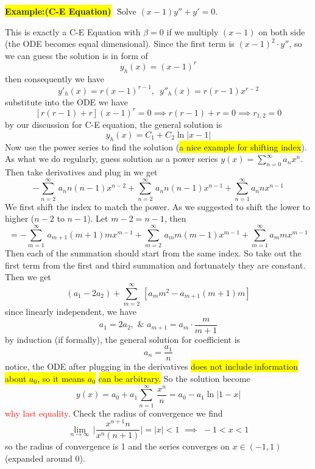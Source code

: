 \documentclass[10pt]{article}
\newcommand{\hilight}[1]{\colorbox{yellow}{#1}}
\newenvironment{changemargin}[2]{%
  \begin{list}{}{%
    \setlength{\topsep}{0pt}%
    \setlength{\leftmargin}{#1}%
    \setlength{\rightmargin}{#2}%
    \setlength{\listparindent}{\parindent}%
    \setlength{\itemindent}{\parindent}%
    \setlength{\parsep}{\parskip}%
  }%
  \item[]}{\end{list}}
\begin{document}
\begin{changemargin}{-0.125in}{0in}
\begin{enumerate}
	  
      \hilight{\textbf{Example:(C-E Equation)}} \,\,\.Solve $(x - 1)y'' + y' = 0$. 
	  
	  \medskip
	  
	   This is exactly a C-E Equation with $\beta = 0$ if we multiply $(x -1)$ on both side (the ODE becomes equal dimensional). Since the first term is $(x-1)^2\cdot y''$, so we can guess the solution is in form of 
	   \[
	   y_h(x) = (x - 1)^r
	   \]
	   then consequently we have 
	   \[
	   y'_h(x) = r(x - 1)^{r-1},\,\,\, y''_h(x) = r(r-1)x^{r-2}
	   \]
	   substitute into the ODE we have 
	   \[
	   [r(r-1) + r] (x-1)^r = 0 \implies r(r-1) + r = 0 \implies r_{1,2} = 0
	   \]
	   by our discussion for C-E equation, the general solution is 
	   \[
	   y_h(x) = C_1 + C_2 \ln |x-1|
	   \]
	   Now use the power series to find the solution (\hilight{a nice example for shifting index}). As what we do regularly, guess solution as a power series $y(x) = \sum^\infty_{n=0} a_nx^n$. Then take derivatives and plug in we get 
	   \[
	   -\sum_{n=2}^\infty \,a_n n (n-1) x^{n-2} + \sum_{n=2}^\infty \,a_n n (n-1) x^{n-1}   + \sum_{n=1}^\infty a_n n x^{n-1}
	   	   \]
	   	   We first shift the index to match the power. As we suggested to shift the lower to higher ($n-2$ to $n-1$). Let $m-2 = n-1$, then 
	   	   \[
	   	   = -\sum_{m=1}^\infty \,a_{m+1} (m+1) m x^{m-1} + \sum_{m=2}^\infty \,a_m m (m-1) x^{m-1}   + \sum_{m=1}^\infty a_m m x^{m-1}
	   	   \]
	   	   Then each of the summation should start from the same index. So take out the first term from the first and third summation and fortunately they are constant. Then we get 
	   	   \[
	   	   (a_1 - 2a_2) + \sum_{m=2}^\infty \, [a_{m}m^2 - a_{m+1}(m+1)m]
	   	   \] 
	   	   since linearly independent, we have 
	   	   \[
	   	   a_1 = 2a_2,\,\,\&\,\,a_{m+1} = a_m \cdot \frac{m}{m+1} 
	   	   \]
	   	   by induction (if formally), the general solution for coefficient is 
	   	   \[
	   	   a_n = \frac{a_1}{n}
	   	   \]
	   	   notice, the ODE after plugging in the derivatives \hilight{does not include information about $a_0$, so it means $a_0$} \hilight{can be arbitrary.} So the solution become 
	   	   \[
	   	   y(x) = a_0 +  a_1\sum^\infty_{n =1} \,\frac{x^n}{n} =a_0 - a_1 \ln |1-x| 
	   	   \]
	   	   \textcolor{red}{why last equality}. Check the radius of convergence we find 
	   	   \[
	   	   \lim_{n\rightarrow \infty}\,\bigg| \frac{x^{n+1}n}{x^n (n+1)} \bigg| = | x | < 1 \,\,\implies\,\, -1<x<1
	   	   \]
	   	   so the radius of convergence is 1 and the series converges on $x \in (-1,1)$ (expanded around 0). 
	   	   

\end{enumerate}
\end{changemargin}
\end{document}
